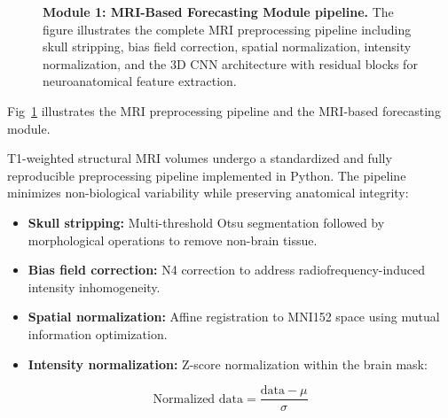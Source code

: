 \documentclass[10pt,letterpaper]{article}
\begin{document}
                                            \begin{figure}[!h]
                                            \caption{\textbf{Module 1: MRI-Based Forecasting Module pipeline.}
                                            The figure illustrates the complete MRI preprocessing pipeline including skull stripping, bias field correction, spatial normalization, intensity normalization, and the 3D CNN architecture with residual blocks for neuroanatomical feature extraction.}
                                            \label{fig:module1}
                                            \end{figure}

                                            Fig~\ref{fig:module1} illustrates the MRI preprocessing pipeline and the MRI-based forecasting module.

                                            T1-weighted structural MRI volumes undergo a standardized and fully reproducible preprocessing pipeline implemented in Python. The pipeline minimizes non-biological variability while preserving anatomical integrity:
                                            \begin{itemize}
                                                \item \textbf{Skull stripping:} Multi-threshold Otsu segmentation followed by morphological operations to remove non-brain tissue.
                                                    \item \textbf{Bias field correction:} N4 correction to address radiofrequency-induced intensity inhomogeneity.
                                                        \item \textbf{Spatial normalization:} Affine registration to MNI152 space using mutual information optimization.
                                                            \item \textbf{Intensity normalization:} Z-score normalization within the brain mask:
                                                            \end{itemize}

                                                            \begin{equation} \label{eq_rob:1}
                                                            \text{Normalized data} = \frac{\text{data} - \mu}{\sigma}
                                                            \end{equation}
\end{document}
